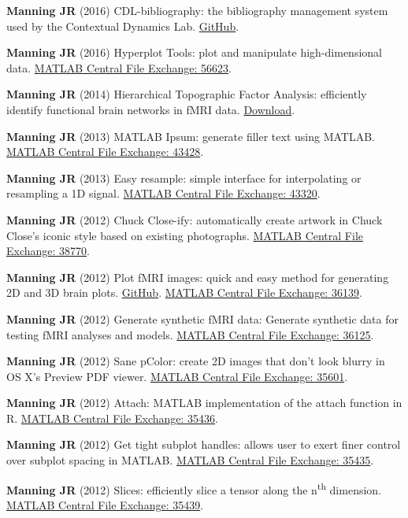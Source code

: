 \documentclass[11pt, a4paper]{article} %
\begin{document}
\begin{etaremune}
\item \textbf{Manning JR} (2016) CDL-bibliography: the bibliography management system used by the Contextual Dynamics Lab. \href{https://github.com/ContextLab/CDL-bibliography}{GitHub}.
\item \textbf{Manning JR} (2016) Hyperplot Tools: plot and manipulate high-dimensional data. \href{http://www.mathworks.com/matlabcentral/fileexchange/56623}{MATLAB Central File Exchange: 56623}.
\item \textbf{Manning JR} (2014) Hierarchical Topographic Factor Analysis: efficiently identify functional brain networks in fMRI data. \href{https://app.box.com/s/elcxpst2n0q6elpuzndj}{Download}.
\item \textbf{Manning JR} (2013) MATLAB Ipsum: generate filler text using MATLAB. \href{http://www.mathworks.com/matlabcentral/fileexchange/43428}{MATLAB Central File Exchange: 43428}.
\item \textbf{Manning JR} (2013) Easy resample: simple interface for interpolating or resampling a 1D signal. \href{http://www.mathworks.com/matlabcentral/fileexchange/43320}{MATLAB Central File Exchange: 43320}.
\item \textbf{Manning JR} (2012) Chuck Close-ify: automatically create artwork in Chuck Close's iconic style based on existing photographs. \href{http://www.mathworks.com/matlabcentral/fileexchange/38770}{MATLAB Central File Exchange: 38770}.
\item \textbf{Manning JR} (2012) Plot fMRI images: quick and easy method for generating 2D and 3D brain plots. \href{https://github.com/ContextLab/brain-plots}{GitHub}. \href{http://www.mathworks.com/matlabcentral/fileexchange/36139}{MATLAB Central File Exchange: 36139}.
\item \textbf{Manning JR} (2012) Generate synthetic fMRI data: Generate synthetic data for testing fMRI analyses and models. \href{http://www.mathworks.com/matlabcentral/fileexchange/36125}{MATLAB Central File Exchange: 36125}.
\item \textbf{Manning JR} (2012) Sane pColor: create 2D images that don't look blurry in OS X's Preview PDF viewer. \href{http://www.mathworks.com/matlabcentral/fileexchange/35601}{MATLAB Central File Exchange: 35601}.
\item \textbf{Manning JR} (2012) Attach: MATLAB implementation of the attach function in R. \href{http://www.mathworks.com/matlabcentral/fileexchange/35436}{MATLAB Central File Exchange: 35436}.
\item \textbf{Manning JR} (2012) Get tight subplot handles: allows user to exert finer control over subplot spacing in MATLAB. \href{http://www.mathworks.com/matlabcentral/fileexchange/35435}{MATLAB Central File Exchange: 35435}.
\item \textbf{Manning JR} (2012) Slices: efficiently slice a tensor along the n\textsuperscript{th} dimension. \href{http://www.mathworks.com/matlabcentral/fileexchange/35439}{MATLAB Central File Exchange: 35439}.
\end{etaremune}
\end{document}

